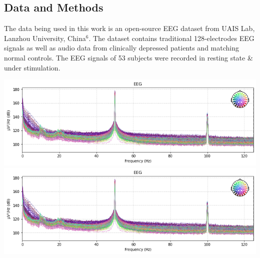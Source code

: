 \documentclass[a0,portrait]{a0poster}
\begin{document}
\begin{minipage}[c]{\linewidth}
\begin{framed}
\begin{multicols}{2}
\section*{Data and Methods}
The data being used in this work is an open-source EEG dataset from UAIS Lab, Lanzhou University, China$^6$. The dataset contains traditional 128-electrodes EEG signals as well as audio data from clinically depressed patients and matching normal controls. The EEG signals of 53 subjects were recorded in resting state \& under stimulation.  \\
\begin{center}
\hspace*{\fill}
\includegraphics[width=0.49\linewidth]{figures/mdd}
\includegraphics[clip,width=0.49\linewidth]{figures/hc}
\label{IGSMap}
\end{center}

\end{multicols}
\end{framed}
\end{minipage}
\end{document}

